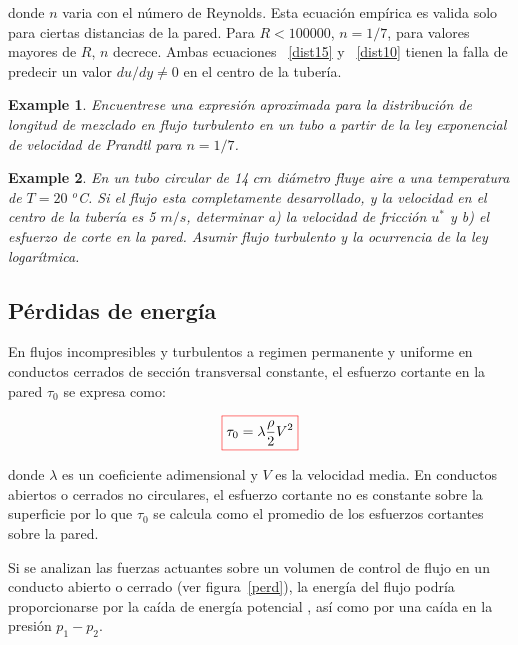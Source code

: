 \documentclass[11pt, oneside]{article}
\newtheorem{exa}{Example}
\begin{document}
donde $n$ varia con el n\'umero de Reynolds. Esta ecuaci\'on emp\'irica es valida solo para ciertas distancias de la pared. Para $R < 100000$, $n=1/7$, para valores mayores de $R$, $n$ decrece. Ambas ecuaciones ~\ref{dist15} y ~\ref{dist10} tienen la falla de predecir un valor $du/dy \neq 0$ en el centro de la tuber\'ia.

\begin{shaded}
\begin{exa}
Encuentrese una expresi\'on  aproximada para la distribuci\'on de longitud de mezclado en flujo turbulento en un tubo a partir de la ley exponencial de velocidad de Prandtl para $n=1/7$. 
\end{exa}
\end{shaded}

\begin{shaded}
\begin{exa}
En un tubo circular de 14 $cm$ di\'ametro fluye aire a una temperatura de $T = 20$ $^o$C. Si el flujo esta completamente desarrollado, y la velocidad en el centro de la tuber\'ia es 5 $m/s$, determinar a) la velocidad de fricci\'on $u^*$ y b) el esfuerzo de corte en la pared. Asumir flujo turbulento y la ocurrencia de la ley logar\'itmica.
\end{exa}
\end{shaded}

\subsection{P\'erdidas de energ\'ia} %
En flujos incompresibles y turbulentos a regimen permanente y uniforme en conductos cerrados de secci\'on transversal constante, el esfuerzo cortante en la pared $\tau_0$ se expresa como:

\begin{equation}
\color{red}\boxed{\color{black} \tau_0 = \lambda \frac{\rho}{2} V^2 }
\label{perd0}
\end{equation}

donde $\lambda$ es un coeficiente  adimensional y $V$ es la velocidad media. En conductos abiertos o cerrados no circulares, el esfuerzo cortante no es constante sobre la superficie por lo que $\tau_0$ se calcula como el promedio de los esfuerzos cortantes sobre la pared. 

Si se analizan las fuerzas actuantes sobre un volumen de control de flujo en un conducto abierto o cerrado (ver figura~\ref{perd}), la energ\'ia del flujo podr\'ia proporcionarse por la ca\'ida de energ\'ia potencial , as\'i como por una ca\'ida en la presi\'on $p_1 - p_2$. 
\end{document}
